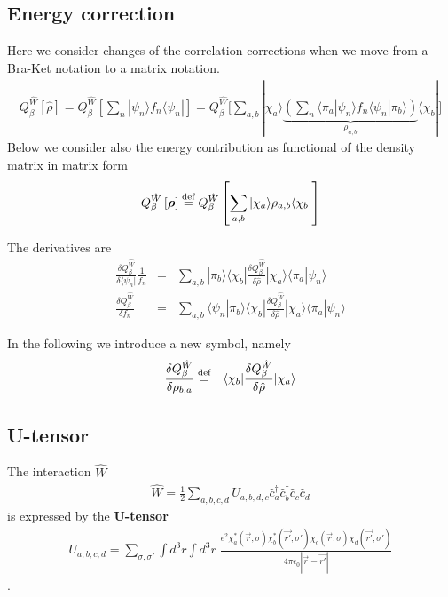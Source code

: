\documentclass[11pt,a4paper]{report}
\begin{document}
\subsection{Energy correction}
Here we consider changes of the correlation corrections when we move
from a Bra-Ket notation to a matrix notation.
\begin{eqnarray}
Q_\beta^{\hat{W}}\left[\hat{\rho}\right]
=Q_\beta^{\hat{W}}\left[\sum_n|\psi_n\rangle f_n\langle\psi_n|\right]
=
Q_\beta^{\hat{W}}\biggl[\sum_{a,b}|\chi_a\rangle
\underbrace{\left(
\sum_n\langle\pi_a|\psi_n\rangle f_n\langle\psi_n|\pi_b\rangle
\right)}_{\rho_{a,b}}\langle\chi_b|
\biggr]
\end{eqnarray}
Below we consider also the energy contribution as functional of the
density matrix in matrix form
\begin{eqnarray}
Q_\beta^{\hat{W}}\left[\bm{\rho}\right]\stackrel{\text{def}}{=}
Q_\beta^{\hat{W}}\left[\sum_{a,b}|\chi_a\rangle\rho_{a,b}\langle\chi_b|\right]
\end{eqnarray}

The derivatives are
\begin{eqnarray}
\frac{\delta Q_\beta^{\hat{W}}}{\delta\langle\psi_n|}\frac{1}{f_n}
&=&\sum_{a,b}|\pi_b\rangle
\langle\chi_b|\frac{\delta Q_\beta^{\hat{W}}}{\delta\hat{\rho}}
|\chi_a\rangle
\langle\pi_a|\psi_n\rangle 
\nonumber\\
\frac{\delta Q_\beta^{\hat{W}}}{\delta f_n}
&=&\sum_{a,b}\langle\psi_n|\pi_b\rangle
\langle\chi_b|\frac{\delta Q_\beta^{\hat{W}}}{\delta\hat{\rho}}
|\chi_a\rangle
\langle\pi_a|\psi_n\rangle 
\end{eqnarray}


In the following we introduce a new symbol, namely
\begin{eqnarray}
\frac{\delta Q_\beta^{\hat{W}}}{\delta\rho_{b,a}}
&\stackrel{\text{def}}{=}&
\langle\chi_b|\frac{\delta Q_\beta^{\hat{W}}}{\delta\hat{\rho}}
|\chi_a\rangle
\end{eqnarray}

\subsection{U-tensor}
The interaction $\hat{W}$  
\begin{eqnarray}
\hat{W}
=\frac{1}{2}\sum_{a,b,c,d} U_{a,b,d,c}
\hat{c}^\dagger_a\hat{c}^\dagger_b\hat{c}_c\hat{c}_d
\end{eqnarray}
is expressed by the \textbf{U-tensor}
\begin{eqnarray}
U_{a,b,c,d}=\sum_{\sigma,\sigma'}\int d^3r\int d^3r\;
\frac{e^2\chi^*_a(\vec{r},\sigma)\chi^*_b(\vec{r'},\sigma')
\chi_c(\vec{r},\sigma)\chi_d(\vec{r'},\sigma')}
{4\pi\epsilon_0|\vec{r}-\vec{r'}|}
\end{eqnarray}.
\end{document}
